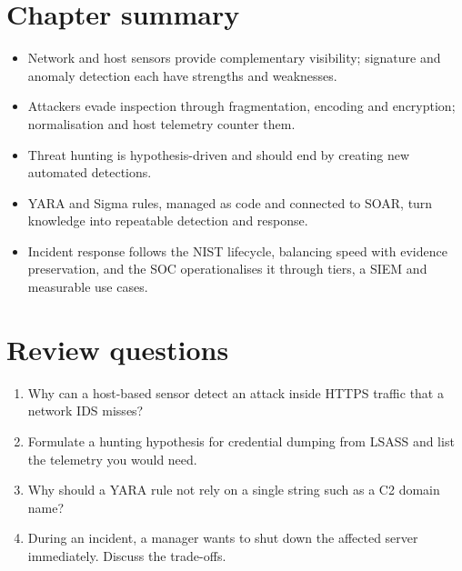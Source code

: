 \section*{Chapter summary}
\begin{itemize}
  \item Network and host sensors provide complementary visibility; signature and anomaly detection each have strengths and weaknesses.
  \item Attackers evade inspection through fragmentation, encoding and encryption; normalisation and host telemetry counter them.
  \item Threat hunting is hypothesis-driven and should end by creating new automated detections.
  \item YARA and Sigma rules, managed as code and connected to SOAR, turn knowledge into repeatable detection and response.
  \item Incident response follows the NIST lifecycle, balancing speed with evidence preservation, and the SOC operationalises it through tiers, a SIEM and measurable use cases.
\end{itemize}

\section*{Review questions}
\begin{enumerate}
  \item Why can a host-based sensor detect an attack inside HTTPS traffic that a network IDS misses?
  \item Formulate a hunting hypothesis for credential dumping from LSASS and list the telemetry you would need.
  \item Why should a YARA rule not rely on a single string such as a C2 domain name?
  \item During an incident, a manager wants to shut down the affected server immediately. Discuss the trade-offs.
\end{enumerate}
